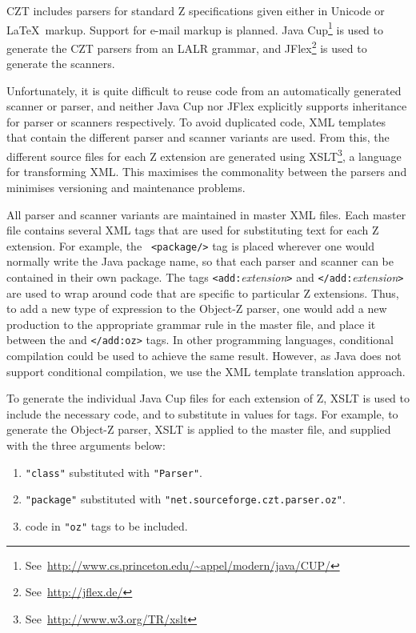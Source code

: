 \documentclass{llncs}
\begin{document}
  CZT includes parsers for standard Z specifications given either in
  Unicode or \LaTeX\ markup.  Support for e-mail markup is planned.  Java
  Cup\footnote{See~\url{http://www.cs.princeton.edu/~appel/modern/java/CUP/}}
  is used to generate the CZT parsers from an LALR grammar, and
  JFlex\footnote{See~\url{http://jflex.de/}} is used to generate the
  scanners.

  Unfortunately, it is quite difficult to reuse code from an
  automatically generated scanner or parser, and neither Java Cup nor
  JFlex explicitly supports inheritance for parser or scanners
  respectively.  To avoid duplicated code, XML templates that contain
  the different parser and scanner variants are used. From this, the
  different source files for each Z extension are generated using
  XSLT\footnote{See~\url{http://www.w3.org/TR/xslt}}, a language
  for transforming XML.  This maximises the commonality between the
  parsers and minimises versioning and maintenance problems.

  All parser and scanner variants are maintained in master XML files.
  Each master file contains several XML tags that are used for
  substituting text for each Z extension. For example, the {\tt
  <package/>} tag is placed wherever one would normally write the Java
  package name, so that each parser and scanner can be contained in
  their own package. The tags {\tt <add:}{\em extension}{\tt >} and
  {\tt </add:}{\em extension}{\tt >} are used to wrap around code that
  are specific to particular Z extensions. Thus, to add a new type of
  expression to the Object-Z parser, one would add a new production to
  the appropriate grammar rule in the master file, and place it
  between the {\tt <add:oz>} and {\tt </add:oz>} tags. In other
  programming languages, conditional compilation could be used to
  achieve the same result. However, as Java does not support
  conditional compilation, we use the XML template translation
  approach.

To generate the individual Java Cup files for each extension of Z,
XSLT is used to include the necessary code, and to substitute in
values for tags. For example, to generate the Object-Z parser, XSLT is
applied to the master file, and supplied with the three arguments
below:
\begin{enumerate}
  \item {\tt "class"} substituted with {\tt "Parser"}.
  \item {\tt "package"} substituted with {\tt "net.sourceforge.czt.parser.oz"}.
  \item code in {\tt "oz"} tags to be included.
\end{enumerate}
\end{document}
